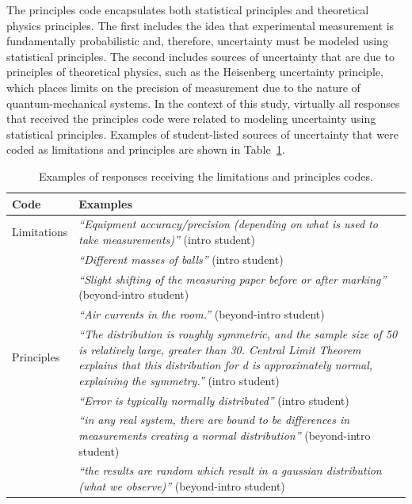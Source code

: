 \documentclass[english,aps,prstper,reprint,showpacs,longbibliography,superscriptaddress,nofootinbib]{revtex4-2}
\begin{document}
The principles code encapsulates both statistical principles and theoretical physics principles. The first includes the idea that experimental measurement is fundamentally probabilistic and, therefore, uncertainty must be modeled using statistical principles. The second includes sources of uncertainty that are due to principles of theoretical physics, such as the Heisenberg uncertainty principle, which places limits on the precision of measurement due to the nature of quantum-mechanical systems. In the context of this study, virtually all responses that received the principles code were related to modeling uncertainty using statistical principles. Examples of student-listed sources of uncertainty that were coded as limitations and principles are shown in Table~\ref{ta:sources}.

\begin{table}[tb] 
  \caption{Examples of responses receiving the limitations and principles codes.}
  \label{ta:sources}
  \begin{ruledtabular}
    \begin{tabular}{p{}p{}}
    \textbf{Code} & \textbf{Examples}\\
      \hline
    Limitations & \textit{``Equipment accuracy/precision (depending on what is used to take measurements)''} (intro student)\\
    & \textit{``Different masses of balls''} (intro student) \\
    & \textit{``Slight shifting of the measuring paper before or after marking''} (beyond-intro student) \\
    & \textit{``Air currents in the room.''} (beyond-intro student) \\
    \hline
    Principles & \textit{``The distribution is roughly symmetric, and the sample size of 50 is relatively large, greater than 30. Central Limit Theorem explains that this distribution for d is approximately normal, explaining the symmetry.''} (intro student)  \\
    &\textit{``Error is typically normally distributed''} (intro student) \\
    & \textit{``in any real system, there are bound to be differences in measurements creating a normal distribution''} (beyond-intro student) \\
    & \textit{``the results are random which result in a gaussian distribution (what we observe)''} (beyond-intro student) \\
    \end{tabular}
  \end{ruledtabular}
\end{table}
\end{document}
